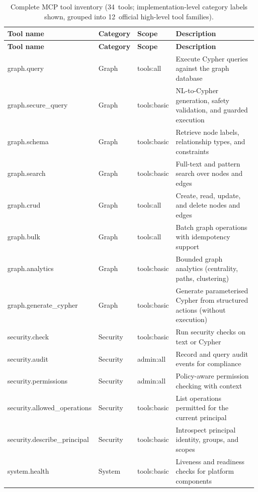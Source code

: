 \documentclass[a4paper,noexaminfo]{sapthesis}
\begin{document}
{\footnotesize
\begin{longtable}{@{}l l l p{4.0cm}@{}}
\caption{Complete MCP tool inventory (34~tools; implementation-level
category labels shown, grouped into 12~official high-level tool
families).}
\label{tab:app-tool-inventory} \\
\hline
\textbf{Tool name} & \textbf{Category} & \textbf{Scope} &
    \textbf{Description} \\
\hline
\endfirsthead
\hline
\textbf{Tool name} & \textbf{Category} & \textbf{Scope} &
    \textbf{Description} \\
\hline
\endhead
\hline
\endfoot
graph.query          & Graph & tools:all   & Execute Cypher queries against the graph database \\
graph.secure\_query  & Graph & tools:basic & NL-to-Cypher generation, safety validation, and guarded execution \\
graph.schema         & Graph & tools:basic & Retrieve node labels, relationship types, and constraints \\
graph.search         & Graph & tools:basic & Full-text and pattern search over nodes and edges \\
graph.crud           & Graph & tools:all   & Create, read, update, and delete nodes and edges \\
graph.bulk           & Graph & tools:all   & Batch graph operations with idempotency support \\
graph.analytics      & Graph & tools:basic & Bounded graph analytics (centrality, paths, clustering) \\
graph.generate\_cypher & Graph & tools:basic & Generate parameterised Cypher from structured actions (without execution) \\
\hline
security.check              & Security & tools:basic & Run security checks on text or Cypher \\
security.audit              & Security & admin:all   & Record and query audit events for compliance \\
security.permissions        & Security & admin:all   & Policy-aware permission checking with context \\
security.allowed\_operations & Security & tools:basic & List operations permitted for the current principal \\
security.describe\_principal & Security & tools:basic & Introspect principal identity, groups, and scopes \\
\hline
system.health  & System & tools:basic & Liveness and readiness checks for platform components \\

\end{longtable}}
\end{document}
